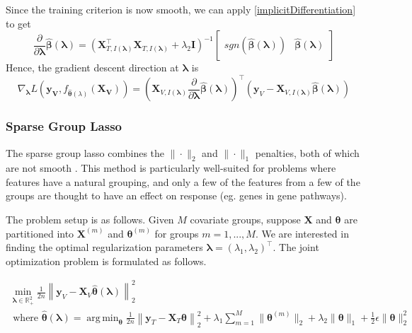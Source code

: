 \documentclass[10pt,letterpaper]{article}
\DeclareMathOperator*{\argmin}{arg\,min}
\begin{document}
Since the training criterion is now smooth, we can apply \eqref{implicitDifferentiation} to get
\begin{equation}
\frac{\partial}{\partial \boldsymbol \lambda} \hat{\boldsymbol{\beta}}(\boldsymbol{\lambda}) = 
\left ( 
\boldsymbol{X}_{T, I(\boldsymbol\lambda)}^\top \boldsymbol{X}_{T, I(\boldsymbol\lambda)} + \lambda_2 \boldsymbol{I}
\right )^{-1}
\begin{bmatrix}
sgn \left (\hat{\boldsymbol{\beta}} (\boldsymbol{\lambda}) \right ) &
\hat{\boldsymbol{\beta}} (\boldsymbol{\lambda})
\end{bmatrix}
\end{equation}
Hence, the gradient descent direction at $\boldsymbol{\lambda}$ is
\begin{equation}
\nabla_{\boldsymbol \lambda} L(\boldsymbol{y_V}, f_{\hat{\boldsymbol{\theta}}(\lambda)}(\boldsymbol{X_V})) =
\left (
\boldsymbol{X}_{V, I(\boldsymbol\lambda)}
\frac{\partial}{\partial \boldsymbol \lambda} \hat{\boldsymbol{\beta}}(\boldsymbol{\lambda})
\right )^{\top}
\left (
\boldsymbol y_V - \boldsymbol{X}_{V, I(\boldsymbol\lambda)} \hat{\boldsymbol{\beta}} (\boldsymbol{\lambda})
\right )
\end{equation}

\subsubsection{Sparse Group Lasso}\label{sec:sgl}

The sparse group lasso combines the $\|\cdot\|_2$ and $\|\cdot\|_1$ penalties, both of which are not smooth \citep{simon2013sparse}. This method is particularly well-suited for problems where features have a natural grouping, and only a few of the features from a few of the groups are thought to have an effect on response (eg. genes in gene pathways).

The problem setup is as follows. Given $M$ covariate groups, suppose $\boldsymbol{X}$ and $\boldsymbol \theta$ are partitioned into $\boldsymbol{X}^{(m)}$ and $\boldsymbol \theta^{(m)}$ for groups $m = 1, ... , M$. We are interested in finding the optimal regularization parameters $\boldsymbol{\lambda} = (\lambda_1, \lambda_2)^\top$. The joint optimization problem is formulated as follows.

\begin{equation}
\begin{array}{c}
\min_{\boldsymbol{\lambda} \in \mathbb{R}^2_{+}} \frac{1}{2n}
\left \| \boldsymbol{y}_V - \boldsymbol{X}_V \hat{\boldsymbol{\theta}}(\boldsymbol{\lambda}) \right \|^2_2 \\
\text{ where }
\hat{\boldsymbol{\theta}}(\boldsymbol{\lambda}) =
\argmin_{\boldsymbol{\theta}} \frac{1}{2n} 
\left \| \boldsymbol{y}_T - \boldsymbol{X}_T \boldsymbol{\theta} \right \|^2_2
+ \lambda_1 \sum_{m=1}^M \| \boldsymbol\theta^{(m)} \|_2
+ \lambda_2 \| \boldsymbol\theta \|_1
+ \frac{1}{2} \epsilon \| \boldsymbol\theta \|_2^2
\end{array}
\end{equation}
\end{document}
